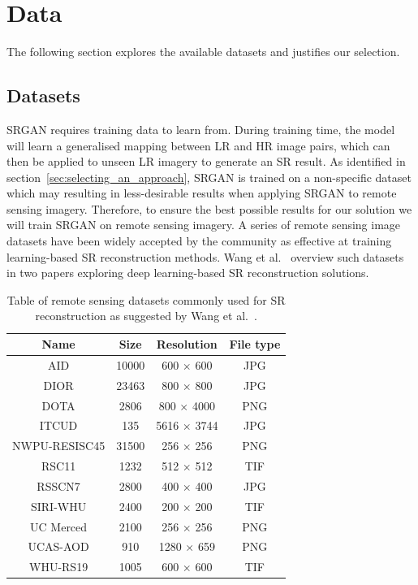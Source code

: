 \section{Data}
The following section explores the available datasets and justifies our selection.

\subsection{Datasets}
SRGAN requires training data to learn from. During training time, the model will learn a generalised mapping between LR and HR image pairs, which can then be applied to unseen LR imagery to generate an SR result. As identified in section~\ref{sec:selecting_an_approach}, SRGAN is trained on a non-specific dataset which may resulting in less-desirable results when applying SRGAN to remote sensing imagery. Therefore, to ensure the best possible results for our solution we will train SRGAN on remote sensing imagery. A series of remote sensing image datasets have been widely accepted by the community as effective at training learning-based SR reconstruction methods. Wang et al.~\cite{remoteSensingDeepLearningReview, remoteSensingGANsReview} overview such datasets in two papers exploring deep learning-based SR reconstruction solutions.
\begin{table}
    \centering
    \begin{tabular}{cccc}
        \toprule
        \textbf{Name} & \textbf{Size} & \textbf{Resolution} & \textbf{File type} \\
        \midrule
        AID & 10000 & 600 $\times$ 600 & JPG \\
        DIOR & 23463 & 800 $\times$ 800 & JPG \\
        DOTA & 2806 & 800 $\times$ 4000 & PNG \\
        ITCUD & 135 & 5616 $\times$ 3744 & JPG \\
        NWPU-RESISC45 & 31500 & 256 $\times$ 256 & PNG \\
        RSC11 & 1232 & 512 $\times$ 512 & TIF \\
        RSSCN7 & 2800 & 400 $\times$ 400 & JPG \\
        SIRI-WHU & 2400 & 200 $\times$ 200 & TIF \\
        UC Merced & 2100 & 256 $\times$ 256 & PNG \\
        UCAS-AOD & 910 & 1280 $\times$ 659 & PNG \\
        WHU-RS19 & 1005 & 600 $\times$ 600 & TIF \\
        \bottomrule
    \end{tabular}
    \caption{Table of remote sensing datasets commonly used for SR reconstruction as suggested by Wang et al.~\cite{remoteSensingDeepLearningReview,remoteSensingGANsReview}.}
    \label{table:datasets_table}
\end{table}

